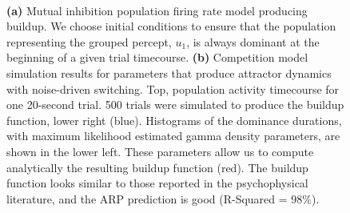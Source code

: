 \documentclass{frontiersSCNS} %
\begin{document}
\begin{figure}
	\centering
	 \\
	\vspace{20 pt}
	
	\caption{\textbf{(a)} Mutual inhibition population firing rate model producing buildup. We choose initial conditions to ensure that the population representing the grouped percept, $u_1$, is always dominant at the beginning of a given trial timecourse. \textbf{(b)} Competition model simulation results for parameters that produce attractor dynamics with noise-driven switching. Top, population activity timecourse for one 20-second trial. 500 trials were simulated to produce the buildup function, lower right (blue). Histograms of the dominance durations, with maximum likelihood estimated gamma density parameters, are shown in the lower left. These parameters allow us to compute analytically the resulting buildup function (red).  The buildup function looks similar to those reported in the psychophysical literature, and the ARP prediction is good (R-Squared = 98\%).}
	\label{fig:making_comp_BUFs}
\end{figure}
\end{document}
